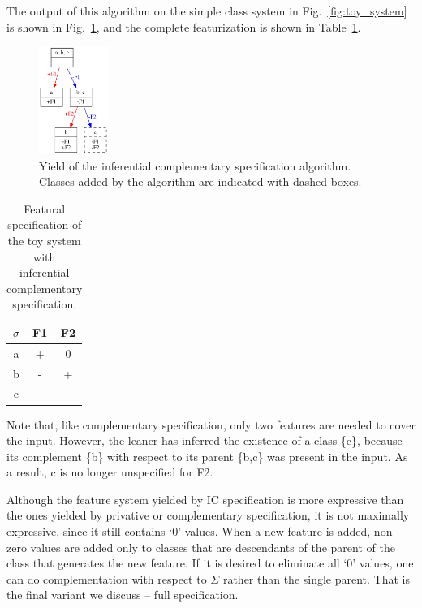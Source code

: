 \documentclass[12pt, oneside]{article}   	%
\begin{document}
The output of this algorithm on the simple class system in Fig.~\ref{fig:toy_system} is shown in Fig.~\ref{fig:toy_system_contrastive_features}, and the complete featurization is shown in Table~\ref{table:toy_system_contrastive}. 

\begin{figure}[htb!]
	\centering
	\includegraphics[width=0.2\textwidth]{toy_system_contrastive_features.png}
	\caption{Yield of the inferential complementary specification algorithm. Classes added by the algorithm are indicated with dashed boxes.}
	\label{fig:toy_system_contrastive_features}
\end{figure}

\begin{table}[h]
	\centering
	\begin{tabular} {|c||c|c|}
		\hline
		$\sigma$ & F1 & F2 \\ \hline
		a & + & 0 \\
		b & - & + \\
		c & - & - \\
		\hline
	\end{tabular}
	\caption{Featural specification of the toy system with inferential complementary specification.}
	\label{table:toy_system_contrastive}
\end{table}

Note that, like complementary specification, only two features are needed to cover the input. However, the leaner has inferred the existence of a class \{c\}, because its complement \{b\} with respect to its parent \{b,c\} was present in the input. As a result, c is no longer unspecified for F2.

Although the feature system yielded by IC specification is more expressive than the ones yielded by privative or complementary specification, it is not maximally expressive, since it still contains `$0$' values. When a new feature is added, non-zero values are added only to classes that are descendants of the parent of the class that generates the new feature. If it is desired to eliminate all `$0$' values, one can do complementation with respect to $\Sigma$ rather than the single parent. That is the final variant we discuss -- full specification.
\end{document}
